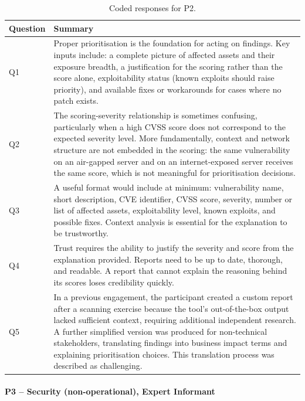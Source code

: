 \begin{table}[h]
\centering
\begin{tabular}{@{}lp{}@{}}
\toprule
\textbf{Question} & \textbf{Summary} \\
\midrule
Q1 & Proper prioritisation is the foundation for acting on findings. Key inputs include: a complete picture of affected assets and their exposure breadth, a justification for the scoring rather than the score alone, exploitability status (known exploits should raise priority), and available fixes or workarounds for cases where no patch exists. \\
\midrule
Q2 & The scoring-severity relationship is sometimes confusing, particularly when a high \ac{CVSS} score does not correspond to the expected severity level. More fundamentally, context and network structure are not embedded in the scoring: the same vulnerability on an air-gapped server and on an internet-exposed server receives the same score, which is not meaningful for prioritisation decisions. \\
\midrule
Q3 & A useful format would include at minimum: vulnerability name, short description, \ac{CVE} identifier, \ac{CVSS} score, severity, number or list of affected assets, exploitability level, known exploits, and possible fixes. Context analysis is essential for the explanation to be trustworthy. \\
\midrule
Q4 & Trust requires the ability to justify the severity and score from the explanation provided. Reports need to be up to date, thorough, and readable. A report that cannot explain the reasoning behind its scores loses credibility quickly. \\
\midrule
Q5 & In a previous engagement, the participant created a custom report after a scanning exercise because the tool's out-of-the-box output lacked sufficient context, requiring additional independent research. A further simplified version was produced for non-technical stakeholders, translating findings into business impact terms and explaining prioritisation choices. This translation process was described as challenging. \\
\bottomrule
\end{tabular}
\caption{Coded responses for P2.}
\label{tab:p2-responses}
\end{table}

\paragraph{P3 -- Security (non-operational), Expert Informant}

